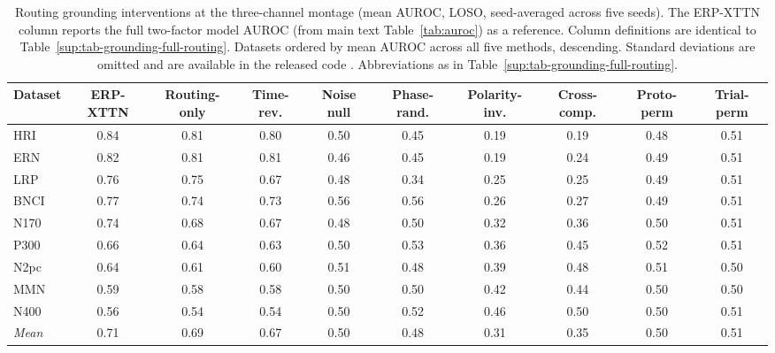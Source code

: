 \begin{table}[t]
\centering
\setlength{\tabcolsep}{5pt}
\caption{%
Routing grounding interventions at the three-channel montage (mean AUROC, LOSO, seed-averaged across five seeds). The ERP-XTTN column reports the full two-factor model AUROC (from main text Table~\ref{tab:auroc}) as a reference. Column definitions are identical to Table~\ref{sup:tab-grounding-full-routing}. Datasets ordered by mean AUROC across all five methods, descending. Standard deviations are omitted and are available in the released code \cite{wyman2026erpxttn_code}. Abbreviations as in Table~\ref{sup:tab-grounding-full-routing}.%
}
\label{sup:tab-grounding-3-routing}
\begin{tabular}{lccccccccc}
\toprule
Dataset & ERP-XTTN & Routing-only & Time-rev. & Noise null & Phase-rand. & Polarity-inv. & Cross-comp. & Proto-perm & Trial-perm \\
\midrule
HRI & 0.84 & 0.81 & 0.80 & 0.50 & 0.45 & 0.19 & 0.19 & 0.48 & 0.51 \\
ERN & 0.82 & 0.81 & 0.81 & 0.46 & 0.45 & 0.19 & 0.24 & 0.49 & 0.51 \\
LRP & 0.76 & 0.75 & 0.67 & 0.48 & 0.34 & 0.25 & 0.25 & 0.49 & 0.51 \\
BNCI & 0.77 & 0.74 & 0.73 & 0.56 & 0.56 & 0.26 & 0.27 & 0.49 & 0.51 \\
N170 & 0.74 & 0.68 & 0.67 & 0.48 & 0.50 & 0.32 & 0.36 & 0.50 & 0.51 \\
P300 & 0.66 & 0.64 & 0.63 & 0.50 & 0.53 & 0.36 & 0.45 & 0.52 & 0.51 \\
N2pc & 0.64 & 0.61 & 0.60 & 0.51 & 0.48 & 0.39 & 0.48 & 0.51 & 0.50 \\
MMN & 0.59 & 0.58 & 0.58 & 0.50 & 0.50 & 0.42 & 0.44 & 0.50 & 0.50 \\
N400 & 0.56 & 0.54 & 0.54 & 0.50 & 0.52 & 0.46 & 0.50 & 0.50 & 0.51 \\
\midrule
\textit{Mean} & 0.71 & 0.69 & 0.67 & 0.50 & 0.48 & 0.31 & 0.35 & 0.50 & 0.51 \\
\bottomrule
\end{tabular}
\end{table}
